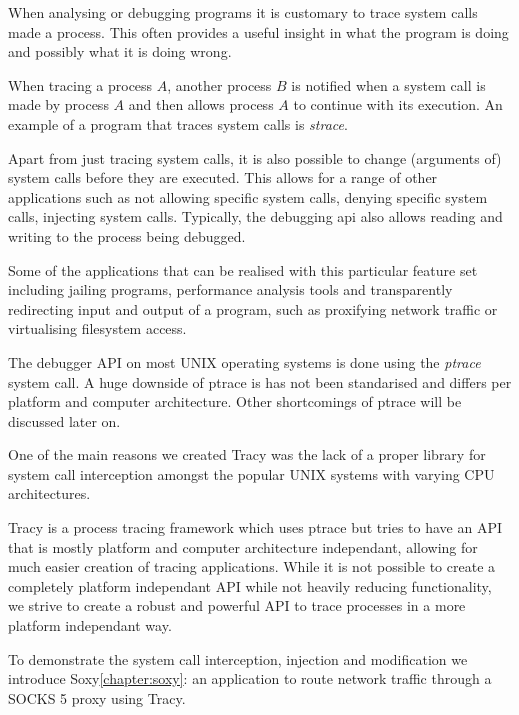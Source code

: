 \documentclass[a4paper, twoside, 10pt, twocolumn]{report}
\begin{document}
When analysing or debugging programs it is customary to trace system calls made
a process. This often provides a useful insight in what the program is doing and
possibly what it is doing wrong.

When tracing a process $A$, another process $B$ is notified when a system call
is made by process $A$  and then allows process $A$ to continue with its
execution. An example of a program that traces system calls is
\textit{strace}\cite{strace}.

Apart from just tracing system calls, it is also possible to change
(arguments of) system calls before they are executed. This allows for a range
of other applications such as not allowing specific system calls, denying
specific system calls, injecting system calls. Typically, the debugging api also
allows reading and writing to the process being debugged.

Some of the applications that can be realised with this particular feature set
including jailing programs, performance analysis tools and transparently
redirecting input and output of a program, such as proxifying network
traffic or virtualising filesystem access.

The debugger API on most UNIX operating systems is done using the
\textit{ptrace} system call. A huge downside of ptrace is has not been
standarised and differs per platform and computer architecture. Other
shortcomings of ptrace will be discussed later on.

One of the main reasons we created Tracy was the lack of a proper library
for system call interception amongst the popular UNIX systems with
varying CPU architectures.

Tracy is a process tracing framework which uses ptrace but tries to have an API
that is mostly platform and computer architecture independant, allowing for much
easier creation of tracing applications. While it is not possible to create a
completely platform independant API while not heavily reducing functionality, we
strive to create a robust and powerful API to trace processes in a more platform
independant way.

To demonstrate the system call interception, injection and modification
we introduce Soxy\ref{chapter:soxy}: an application to route network
traffic through a SOCKS 5 proxy using Tracy.

%
\end{document}
